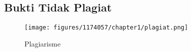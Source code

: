 \subsection{Bukti Tidak Plagiat}
	\begin{figure}[H]
		\centering
		\texttt{[image: figures/1174057/chapter1/plagiat.png]}
		\caption{Plagiarisme}
		\label{print}
	\end{figure}